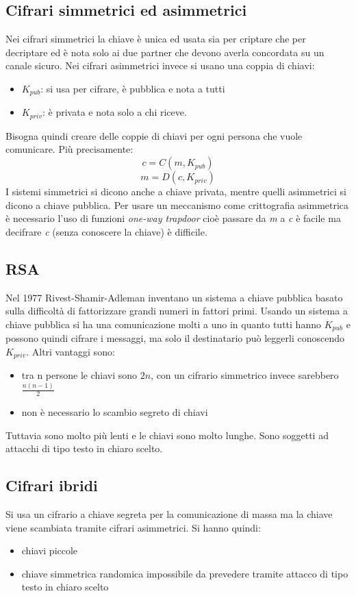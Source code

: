 \subsection{Cifrari simmetrici ed asimmetrici}
Nei cifrari simmetrici la chiave è unica ed usata sia per criptare che per decriptare ed è nota solo ai due partner che devono averla concordata su un canale sicuro.
Nei cifrari asimmetrici invece si usano una coppia di chiavi:
\begin{itemize}
    \item \emph{$K_{pub}$}: si usa per cifrare, è pubblica e nota a tutti
    \item \emph{$K_{priv}$}: è privata e nota solo a chi riceve.
\end{itemize}
Bisogna quindi creare delle coppie di chiavi per ogni persona che vuole comunicare. Più precisamente:
$$ c = C(m, K_{pub}) $$
$$ m = D(c, K_{priv}) $$
I sistemi simmetrici si dicono anche a chiave privata, mentre quelli asimmetrici si dicono a chiave pubblica.
Per usare un meccanismo come crittografia asimmetrica è necessario l'uso di funzioni \emph{one-way trapdoor} cioè passare da \emph{m} a \emph{c} è facile ma decifrare \emph{c} (senza conoscere la chiave) è difficile.

\subsection{RSA}
Nel 1977 Rivest-Shamir-Adleman inventano un sistema a chiave pubblica basato sulla difficoltà di fattorizzare grandi numeri in fattori primi.
Usando un sistema a chiave pubblica si ha una comunicazione molti a uno in quanto tutti hanno $K_{pub}$ e possono quindi cifrare i messaggi, ma solo il destinatario può leggerli conoscendo $K_{priv}$. Altri vantaggi sono:
\begin{itemize}
    \item tra n persone le chiavi sono $2n$, con un cifrario simmetrico invece sarebbero $\frac{n(n-1)}{2}$
    \item non è necessario lo scambio segreto di chiavi
\end{itemize}

Tuttavia sono molto più lenti e le chiavi sono molto lunghe. Sono soggetti ad attacchi di tipo testo in chiaro scelto.

\subsection{Cifrari ibridi}
Si usa un cifrario a chiave segreta per la comunicazione di massa ma la chiave viene scambiata tramite cifrari asimmetrici. Si hanno quindi:
\begin{itemize}
    \item chiavi piccole
    \item chiave simmetrica randomica impossibile da prevedere tramite attacco di tipo testo in chiaro scelto
\end{itemize}

